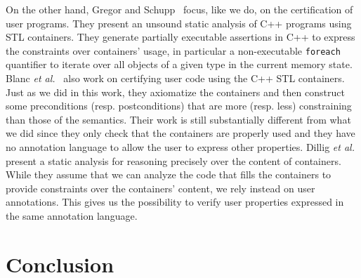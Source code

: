 \documentclass[runningheads,a4paper]{llncs}
\newcommand{\resp}{resp.\xspace}
\newcommand{\etal}{\textit{et al.}\xspace}
\newcommand{\beforesec}{\vspace{-0.2cm}}
\newcommand{\aftersec}{\vspace{-0.2cm}}
\begin{document}
On the other hand, Gregor and Schupp~\cite{gregor:2006:spe} focus, like we do,
on the certification of user programs. They present an unsound static analysis
of C++ programs using STL containers. They generate partially executable
assertions in C++ to express the constraints over containers' usage, in
particular a non-executable \texttt{foreach} quantifier to iterate over all objects of a given
type in the current memory state.  Blanc \etal~\cite{blanc:2007:ase} also work
on certifying user code using the C++ STL
containers. Just as we did in this work, they axiomatize the containers and
then construct some preconditions (\resp postconditions) that are more (\resp
less) constraining than those of the semantics. Their work is still
substantially different from what we did since they only check that the
containers are properly used and they have no annotation language to allow the
user to express other properties.
Dillig \etal~\cite{dillig:2011:popl} present a static analysis for reasoning
precisely over the content of containers. While they assume that we can analyze
the code that fills the containers to provide constraints over the
containers' content, we rely instead on user annotations. This gives 
us the possibility to verify user properties expressed in the same 
annotation language.



\beforesec
\section{Conclusion}
\label{sec:conclusion}
\aftersec
\end{document}

